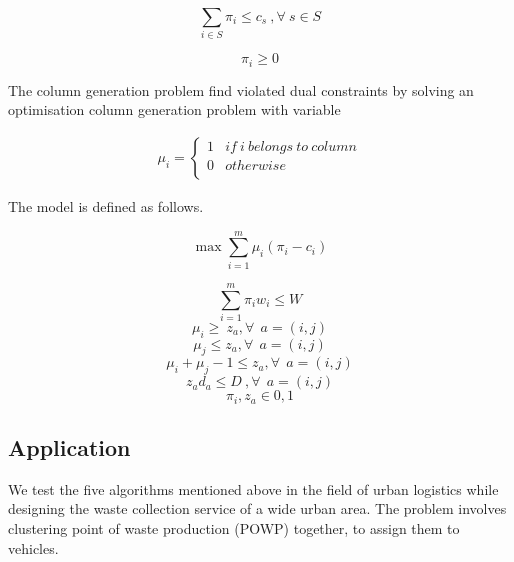 \begin{equation}
    \sum_{i\in S}{\pi_i\le c_s\ , \forall\ s\in S }
\end{equation}

\begin{equation}
    \pi_i\geq0
\end{equation}

The column generation problem find violated dual constraints by solving an optimisation column generation problem with variable

\begin{equation}
   \begin{split}
   \mu_{i}=\left\{
                \begin{array}{ll}
                  1 & if\ i\ belongs\ to\ column\\
                  0 & otherwise\\
                \end{array}
              \right.
   \end{split}
\end{equation}

The model is defined as follows.

\begin{equation}
    \max{\sum_{i=1}^{m}{\mu_i(\pi_i-c_i)}}
\end{equation}

\begin{equation}
    \sum_{i=1}^{m}{\pi_iw_i\le W}
\end{equation}
\begin{equation}
    \mu_i\geq\ z_a , \forall\ \ a=(i,j)
\end{equation}
\begin{equation}
    \mu_j\le z_a , \forall\ \ a=\left(i,j\right)
\end{equation}
\begin{equation}
    \mu_i+\mu_j-1\le z_a , \forall\ \ a=(i,j)
\end{equation}
\begin{equation}
    z_ad_a\le D\ , \forall\ \ a=(i,j)
\end{equation}
\begin{equation}
    \pi_i,z_a\in{0,1}
\end{equation}

\subsection{Application}
We test the five algorithms mentioned above in the field of urban logistics while designing the waste collection service of a wide urban area. The problem involves clustering point of waste production (POWP) together, to assign them to vehicles.\par

